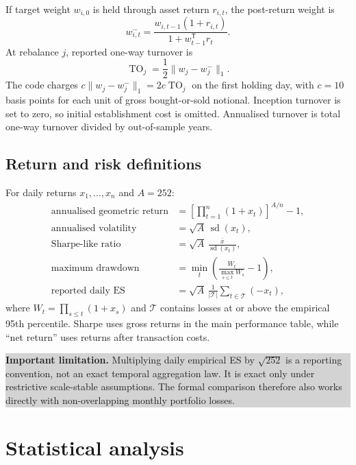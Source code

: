 \documentclass[11pt,a4paper]{article}
\newcommand{\trans}{^{\mathsf T}}
\newcommand{\warningBox}[1]{%
  \begin{center}\colorbox{lightgray}{\parbox{0.93\linewidth}{\textbf{Important limitation.} #1}}\end{center}}
\begin{document}
If target weight $w_{i,0}$ is held through asset return $r_{i,t}$, the post-return weight is
\begin{equation}
 w^-_{i,t}=\frac{w_{i,t-1}(1+r_{i,t})}{1+w_{t-1}\trans r_t}.
\end{equation}
At rebalance $j$, reported one-way turnover is
\begin{equation}
 \operatorname{TO}_j=\frac12\|w_j-w^-_j\|_1.
\end{equation}
The code charges $c\|w_j-w^-_j\|_1=2c\operatorname{TO}_j$ on the first holding day, with $c=10$ basis points for each unit of gross bought-or-sold notional. Inception turnover is set to zero, so initial establishment cost is omitted. Annualised turnover is total one-way turnover divided by out-of-sample years.

\subsection{Return and risk definitions}

For daily returns $x_1,\ldots,x_n$ and $A=252$:
\begin{align}
 \text{annualised geometric return}
 &=\left[\prod_{t=1}^n(1+x_t)\right]^{A/n}-1,\\
 \text{annualised volatility}
 &=\sqrt A\,\operatorname{sd}(x_t),\\
 \text{Sharpe-like ratio}
 &=\sqrt A\,\frac{\bar x}{\operatorname{sd}(x_t)},\\
 \text{maximum drawdown}
 &=\min_t\left(\frac{W_t}{\max_{s\le t}W_s}-1\right),\\
 \text{reported daily ES}
 &=\sqrt A\,\frac{1}{|\mathcal T|}\sum_{t\in\mathcal T}(-x_t),
\end{align}
where $W_t=\prod_{s\le t}(1+x_s)$ and $\mathcal T$ contains losses at or above the empirical 95th percentile. Sharpe uses gross returns in the main performance table, while ``net return'' uses returns after transaction costs.

\warningBox{Multiplying daily empirical ES by $\sqrt{252}$ is a reporting convention, not an exact temporal aggregation law. It is exact only under restrictive scale-stable assumptions. The formal comparison therefore also works directly with non-overlapping monthly portfolio losses.}

\section{Statistical analysis}
\end{document}
